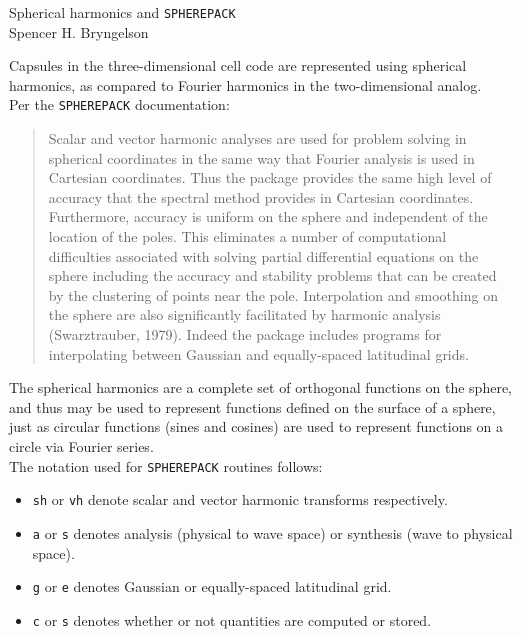 \documentclass[11pt]{article}
\begin{document}
\begin{center}
	{\Large Spherical harmonics and {\texttt{SPHEREPACK}}}\\
	\smallskip
	Spencer H. Bryngelson
\end{center}

Capsules in the three-dimensional cell code are represented using spherical harmonics,
as compared to Fourier harmonics in the two-dimensional analog. \\

Per the {\texttt{SPHEREPACK}} documentation: 
\begin{quote}
	Scalar and vector harmonic analyses are used for problem solving in spherical coordinates 
	in the same way that Fourier analysis is used in Cartesian coordinates. Thus the package 
	provides the same high level of accuracy that the spectral method provides in Cartesian 
	coordinates. Furthermore, accuracy is uniform on the sphere and independent of the location 
	of the poles. This eliminates a number of computational difficulties associated with solving partial 
	differential equations on the sphere including the accuracy and stability problems that can be created 
	by the clustering of points near the pole. Interpolation and smoothing on the sphere are also 
	significantly facilitated by harmonic analysis (Swarztrauber, 1979). Indeed the package includes 
	programs for interpolating between Gaussian and equally-spaced latitudinal grids.
\end{quote}

The spherical harmonics are a complete set of orthogonal functions on the sphere, 
and thus may be used to represent functions defined on the surface of a sphere, just as 
circular functions (sines and cosines) are used to represent functions on a circle via Fourier series. \\

The notation used for \texttt{SPHEREPACK} routines follows: 
\begin{itemize}
	\item \texttt{sh} or \texttt{vh} denote scalar and vector harmonic transforms respectively. 
	\item \texttt{a} or \texttt{s} denotes analysis (physical to wave space) or synthesis
 (wave to physical space). 
	\item \texttt{g} or \texttt{e} denotes Gaussian or equally-spaced latitudinal grid.
 	\item \texttt{c} or \texttt{s} denotes whether or not quantities are computed or stored.
\end{itemize}
\end{document}
